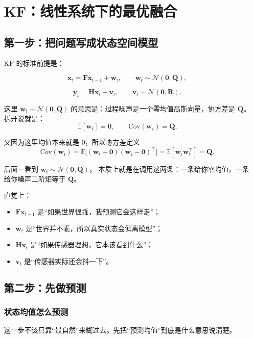 \documentclass[12pt,a4paper]{ctexart}
\begin{document}
\section{KF：线性系统下的最优融合}

\subsection{第一步：把问题写成状态空间模型}

KF 的标准前提是：

\[
\bm{x}_t = \bm{F}\bm{x}_{t-1} + \bm{w}_t,
\qquad
\bm{w}_t \sim \mathcal{N}(\bm{0}, \bm{Q}),
\]

\[
\bm{y}_t = \bm{H}\bm{x}_t + \bm{v}_t,
\qquad
\bm{v}_t \sim \mathcal{N}(\bm{0}, \bm{R}).
\]

这里
\(\bm{w}_t \sim \mathcal{N}(\bm{0}, \bm{Q})\)
的意思是：过程噪声是一个零均值高斯向量，协方差是 \(\bm{Q}\)。拆开说就是：
\[
\mathbb{E}[\bm{w}_t] = \bm{0},
\qquad
\mathrm{Cov}(\bm{w}_t) = \bm{Q}.
\]

又因为这里均值本来就是 0，所以协方差定义
\[
\mathrm{Cov}(\bm{w}_t)
= \mathbb{E}\big[(\bm{w}_t-\bm{0})(\bm{w}_t-\bm{0})^\top\big]
= \mathbb{E}[\bm{w}_t\bm{w}_t^\top]
= \bm{Q}.
\]

后面一看到
\(\bm{w}_t \sim \mathcal{N}(\bm{0}, \bm{Q})\)，
本质上就是在调用这两条：一条给你零均值，一条给你噪声二阶矩等于 \(\bm{Q}\)。

直觉上：

\begin{itemize}
  \item \(\bm{F}\bm{x}_{t-1}\) 是“如果世界很乖，我预测它会这样走”；
  \item \(\bm{w}_t\) 是“世界并不乖，所以真实状态会偏离模型”；
  \item \(\bm{H}\bm{x}_t\) 是“如果传感器理想，它本该看到什么”；
  \item \(\bm{v}_t\) 是“传感器实际还会抖一下”。
\end{itemize}

\subsection{第二步：先做预测}

\subsubsection{状态均值怎么预测}

这一步不该只靠“最自然”来糊过去。先把“预测均值”到底是什么意思说清楚。
\end{document}
